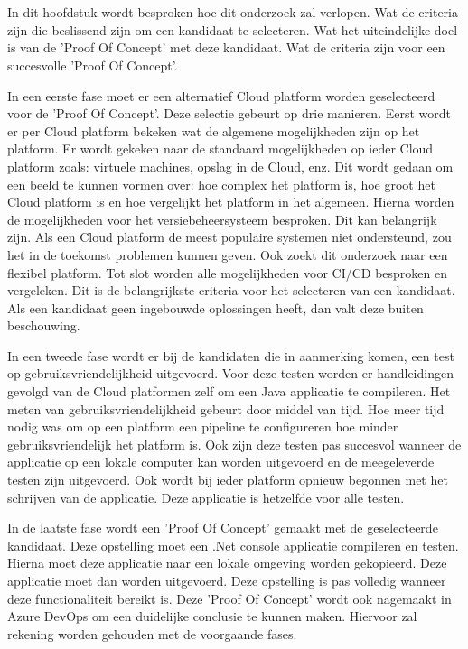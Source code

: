 
\chapter{}
\label{ch:methodologie}
In dit hoofdstuk wordt besproken hoe dit onderzoek zal verlopen. Wat de criteria zijn die beslissend zijn om een kandidaat te selecteren. Wat het uiteindelijke doel is van de 'Proof Of Concept' met deze kandidaat. Wat de criteria zijn voor een succesvolle 'Proof Of Concept'.

In een eerste fase moet er een alternatief Cloud platform worden geselecteerd voor de 'Proof Of Concept'. Deze selectie gebeurt op drie manieren. Eerst wordt er per Cloud platform bekeken wat de algemene mogelijkheden zijn op het platform. Er wordt gekeken naar de standaard mogelijkheden op ieder Cloud platform zoals: virtuele machines, opslag in de Cloud, enz. Dit wordt gedaan om een beeld te kunnen vormen over: hoe complex het platform is, hoe groot het Cloud platform is en hoe vergelijkt het platform in het algemeen. Hierna worden de mogelijkheden voor het versiebeheersysteem besproken. Dit kan belangrijk zijn. Als een Cloud platform de meest populaire systemen niet ondersteund, zou het in de toekomst problemen kunnen geven. Ook zoekt dit onderzoek naar een flexibel platform. Tot slot worden alle mogelijkheden voor CI/CD besproken en vergeleken. Dit is de belangrijkste criteria voor het selecteren van een kandidaat. Als een kandidaat geen ingebouwde oplossingen heeft, dan valt deze buiten beschouwing.

In een tweede fase wordt er bij de kandidaten die in aanmerking komen, een test op gebruiksvriendelijkheid uitgevoerd. Voor deze testen worden er handleidingen gevolgd van de Cloud platformen zelf om een Java applicatie te compileren. Het meten van gebruiksvriendelijkheid gebeurt door middel van tijd. Hoe meer tijd nodig was om op een platform een pipeline te configureren hoe minder gebruiksvriendelijk het platform is. Ook zijn deze testen pas succesvol wanneer de applicatie op een lokale computer kan worden uitgevoerd en de meegeleverde testen zijn uitgevoerd. Ook wordt bij ieder platform opnieuw begonnen met het schrijven van de applicatie. Deze applicatie is hetzelfde voor alle testen.

In de laatste fase wordt een 'Proof Of Concept' gemaakt met de geselecteerde kandidaat. Deze opstelling moet een .Net console applicatie compileren en testen. Hierna moet deze applicatie naar een lokale omgeving worden gekopieerd. Deze applicatie moet dan worden uitgevoerd. Deze opstelling is pas volledig wanneer deze functionaliteit bereikt is. Deze 'Proof Of Concept' wordt ook nagemaakt in Azure DevOps om een duidelijke conclusie te kunnen maken. Hiervoor zal rekening worden gehouden met de voorgaande fases.


